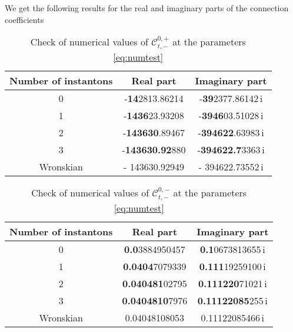 \documentclass[11pt]{article}
\numberwithin{equation}{section}
\begin{document}
We get the following results for the real and imaginary parts of the connection coefficients
\begin{table}[h]
    \centering
    \begin{tabular}{| c | c  c| }
    \hline
     Number of instantons & Real part  & Imaginary part  \\

    \hline   

    0  & -{\bf 14}2813.86214  & -{\bf 39}2377.86142\,i  \\
        
    1  & -{\bf 1436}23.93208  & -{\bf 3946}03.51028\,i  \\

    2  & -{\bf 143630}.89467  & -{\bf 394622}.63983\,i \\

    3  & -{\bf 143630.92}880  & -{\bf 394622.7}3363\,i \\
         \hline

    Wronskian & - 143630.92949 & - 394622.73552\,i \\
         \hline
    \end{tabular}
    \caption{Check of numerical values of $\mathcal{C}_{t,-}^{0,+}$ at the parameters \eqref{eq:numtest}}
\end{table}
\begin{table}[h]
    \centering
    \begin{tabular}{| c | c  c| }
    \hline
     Number of instantons & Real part  & Imaginary part \\

    \hline 

    0  & {\bf 0.0}3884950457  & {\bf 0.1}0673813655\,i  \\

    1  & {\bf 0.0404}7079339 &  {\bf 0.111}19259100\,i  \\

    2  & {\bf 0.040481}02795  & {\bf 0.111220}71021\,i \\

    3  & {\bf 0.0404810}7976  & {\bf 0.11122085}255\,i \\
         \hline
   Wronskian & 0.04048108053 & 0.11122085466\,i \\
         \hline
    \end{tabular}
    \caption{Check of numerical values of $\mathcal{C}_{t,-}^{0,-}$ at the parameters \eqref{eq:numtest}}
\end{table}
\end{document}
